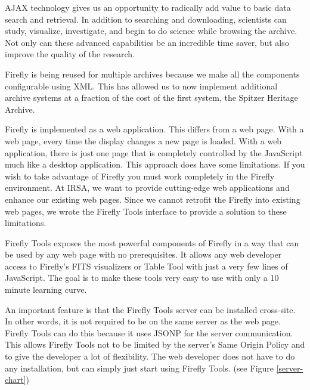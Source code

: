 AJAX technology gives us an opportunity to radically add value to basic data search and retrieval. In addition to searching and downloading, scientists can study, visualize, investigate, and begin to do science while browsing the archive. Not only can these advanced capabilities be an incredible time saver, but also improve the quality of the research.

Firefly is being reused for multiple archives because we make all the components configurable using XML. This has allowed us to now implement additional archive systems at a fraction of the cost of the first system, the Spitzer Heritage Archive.

Firefly is implemented as a web application. This differs from a web page. With a web page, every time the display changes a new page is loaded. With a web application, there is just one page that is completely controlled by the JavaScript much like a desktop application. This approach does have some limitations. If you wish to take advantage of Firefly you must work completely in the Firefly environment. At IRSA, we want to provide cutting-edge web applications and enhance our existing web pages. Since we cannot retrofit the Firefly into existing web pages, we wrote the Firefly Tools interface to provide a solution to these limitations.

Firefly Tools exposes the most powerful components of Firefly in a way that can be used by any web page with no prerequisites. It allows any web developer access to Firefly's FITS visualizers or Table Tool with just a very few lines of JavaScript. The goal is to make these tools very easy to use with only a 10 minute learning curve.  

An important feature is that the Firefly Tools server can be installed cross-site. In other words, it is not required to be on the same server as the web page. Firefly Tools can do this because it uses JSONP for the server communication.  This allows Firefly Tools not to be limited by the server's Same Origin Policy and to give the developer a lot of flexibility. The web developer does not have to do any installation, but can simply just start using Firefly Tools. (see Figure \ref{server-chart})

